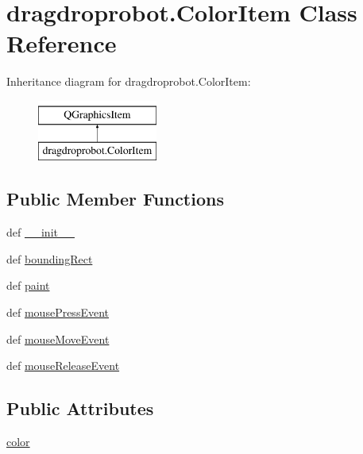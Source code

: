 \hypertarget{classdragdroprobot_1_1ColorItem}{}\section{dragdroprobot.\+Color\+Item Class Reference}
\label{classdragdroprobot_1_1ColorItem}
Inheritance diagram for dragdroprobot.\+Color\+Item\+:\begin{figure}[H]
\begin{center}
\leavevmode
\includegraphics[height=2.000000cm]{classdragdroprobot_1_1ColorItem}
\end{center}
\end{figure}
\subsection*{Public Member Functions}
\begin{DoxyCompactItemize}
\item 
def \hyperlink{classdragdroprobot_1_1ColorItem_a252d13b15fa55e210d6cad7858142753}{\+\_\+\+\_\+init\+\_\+\+\_\+}
\item 
def \hyperlink{classdragdroprobot_1_1ColorItem_a85b3755d2ee7ed600c6ebb3e68c462e1}{bounding\+Rect}
\item 
def \hyperlink{classdragdroprobot_1_1ColorItem_a815a76079f59820b4c153228f004c6ed}{paint}
\item 
def \hyperlink{classdragdroprobot_1_1ColorItem_abe274e1c3c25dd44dc3a033e055e1b58}{mouse\+Press\+Event}
\item 
def \hyperlink{classdragdroprobot_1_1ColorItem_a64214bf049959c9920d75707829d7389}{mouse\+Move\+Event}
\item 
def \hyperlink{classdragdroprobot_1_1ColorItem_ab3e7d01c5f6b8e1f2d91875c3031762c}{mouse\+Release\+Event}
\end{DoxyCompactItemize}
\subsection*{Public Attributes}
\begin{DoxyCompactItemize}
\item 
\hyperlink{classdragdroprobot_1_1ColorItem_af056ca581ed0c6157847964d15123641}{color}
\end{DoxyCompactItemize}
